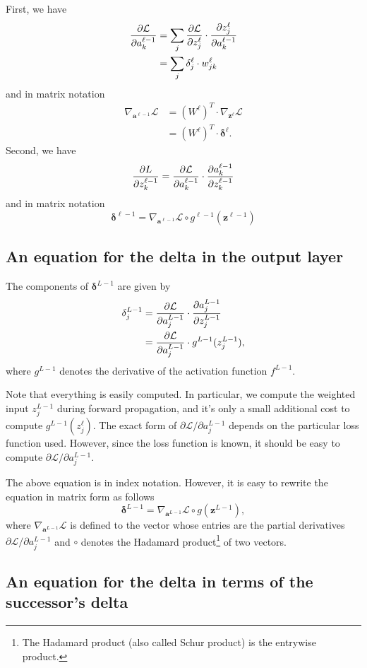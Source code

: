 \documentclass[12pt]{article}
\renewcommand{\a}{\boldsymbol{a}}
\newcommand{\z}{\boldsymbol{z}}
\newcommand{\bdelta}{\boldsymbol{\delta}}
\newcommand{\cL}{\mathcal{L}}
\begin{document}
First, we have
\begin{align}
{\partial \cL \over \partial a^{\ell-1}_k} 
&=
\sum_j {\partial \cL \over \partial z^\ell_j} \cdot {\partial z^\ell_j \over \partial a^{\ell-1}_k} \\
&=
\sum_j {\delta^\ell_j} \cdot w^\ell_{jk}
\end{align}
and in matrix notation
\begin{align}
\nabla_{\a^{\ell-1}} \cL 
&=
(W^\ell)^T \cdot \nabla_{\z^\ell} \cL \\
&= 
(W^\ell)^T \cdot \bdelta^\ell.
\end{align}
Second, we have 
\begin{align}
{\partial L \over \partial z^{\ell-1}_k} = {\partial \cL \over \partial a^{\ell-1}_k} \cdot {\partial a^{\ell-1}_k \over \partial z^{\ell-1}_k}
\end{align}
and in matrix notation
\begin{equation}
\bdelta^{\ell-1} = \nabla_{\a^{\ell-1}} \cL \circ g^{\ell-1}(\z^{\ell-1})
\end{equation}



\newpage

\subsection{An equation for the delta in the output layer}

The components of $\bdelta^{L-1}$ are given by
\begin{align}
\delta^{L-1}_j 
&= 
{\partial \cL \over \partial a^{L-1}_j} \cdot {\partial a^{L-1}_j \over \partial z^{L-1}_j} \\
&= 
{\partial \cL \over \partial a^{L-1}_j} \cdot g^{L-1}(z^{L-1}_j),
\end{align}
where $g^{L-1}$ denotes the derivative of the activation function $f^{L-1}$.

Note that everything is easily computed. In particular, we compute the weighted input $z^{L-1}_j$ during forward propagation, and it's only a small additional cost to compute $g^{L-1}(z^\ell_j)$.
The exact form of ${\partial \cL / \partial a^{L-1}_j}$ depends on the particular loss function used. However, since the loss function is known, it should be easy to compute ${\partial \cL / \partial a^{L-1}_j}$.  

The above equation is in index notation. However, it is easy to rewrite the equation in matrix form as follows
\begin{equation}
\bdelta^{L-1} = \nabla_{\a^{L-1}} \cL \circ g(\z^{L-1}),
\end{equation}
where $\nabla_{\a^{L-1}} \cL$ is defined to the vector whose entries are the partial derivatives ${\partial \cL / \partial a^{L-1}_j}$
and $\circ$ denotes the Hadamard product\footnote{The Hadamard product (also called Schur product) is the entrywise product.} of two vectors.

\subsection{An equation for the delta in terms of the successor's delta}
\end{document}
